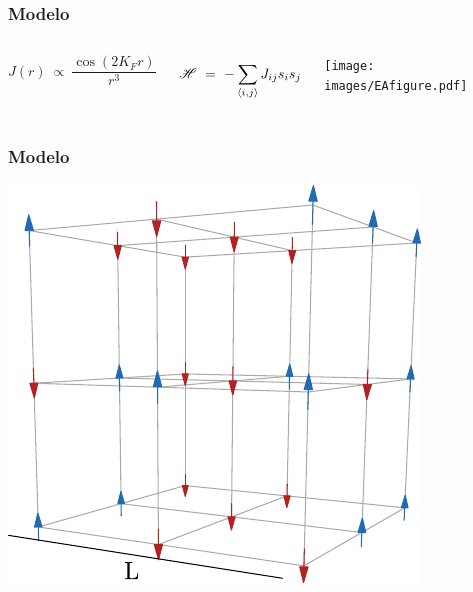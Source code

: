 \documentclass{beamer}
\newcommand{\sub}[1]{ _{{\scriptscriptstyle \mathit{#1}}}  }
\newcommand{\Ham}{\mathscr{H}}
\begin{document}
\begin{frame}
  \frametitle{Modelo}

  \pause

  \begin{columns}


    \begin{equation*}
      J(r) \ ∝ \ \frac{\cos(2K\sub{F} r)}{r^3}
    \end{equation*}

    \pause

    \begin{equation*}
      \Ham \ = \  - \sum_{\expval{i,j}} J_{ij} s_i s_j
    \end{equation*}

    \pause


    \begin{center}
      \texttt{[image: images/EAfigure.pdf]}
    \end{center}

  \end{columns}

\end{frame}

\begin{frame}
  \frametitle{Modelo}
  \begin{center}
    \includegraphics{../study_cases/gridplot/gridplot.pdf}
  \end{center}
\end{frame}
\end{document}

